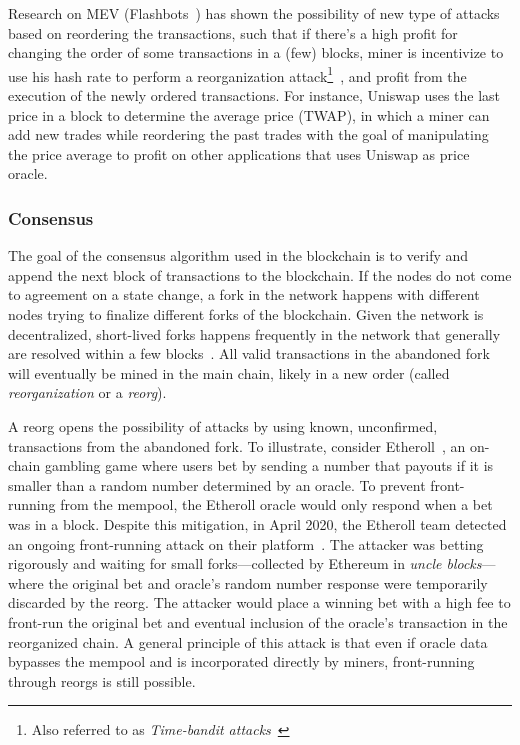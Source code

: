 Research on MEV (\eg Flashbots~\cite{flashbots}) has shown the possibility of new type of attacks based on reordering the transactions, such that if there's a high profit for changing the order of some transactions in a (few) blocks, miner is incentivize to use his hash rate to perform a reorganization attack\footnote{Also referred to as \textit{Time-bandit attacks}~\cite{daian2020flash}}~\cite{lin2017survey}, and profit from the execution of the newly ordered transactions. For instance, Uniswap uses the last price in a block to determine the average price (TWAP), in which a miner can add new trades while reordering the past trades with the goal of manipulating the price average to profit on other applications that uses Uniswap as price oracle. 

\subsubsection{Consensus} \label{consensus}

The goal of the consensus algorithm used in the blockchain is to verify and append the next block of transactions to the blockchain. If the nodes do not come to agreement on a state change, a fork in the network happens with different nodes trying to finalize different forks of the blockchain. Given the network is decentralized, short-lived forks happens frequently in the network that generally are resolved within a few blocks~\cite{neudecker2019short}. All valid transactions in the abandoned fork will eventually be mined in the main chain, likely in a new order (called \textit{reorganization} or a \textit{reorg}). 

A reorg opens the possibility of attacks by using known, unconfirmed, transactions from the abandoned fork. To illustrate, consider Etheroll~\cite{etheroll}, an on-chain gambling game where users bet by sending a number that payouts if it is smaller than a random number determined by an oracle. To prevent front-running from the mempool, the Etheroll oracle would only respond when a bet was in a block. Despite this mitigation, in April 2020, the Etheroll team detected an ongoing front-running attack on their platform~\cite{etherollincident}. The attacker was betting rigorously and waiting for small forks---collected by Ethereum in \textit{uncle blocks}---where the original bet and oracle's random number response were temporarily discarded by the reorg. The attacker would place a winning bet with a high fee to front-run the original bet and eventual inclusion of the oracle's transaction in the reorganized chain. A general principle of this attack is that even if oracle data bypasses the mempool and is incorporated directly by miners, front-running through reorgs is still possible. 

